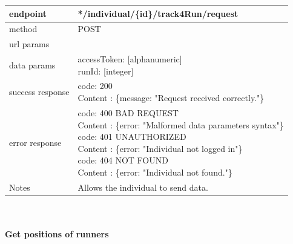 \begin{legal}
\begin{legal}
\begin{itemize}
								\begin{tabularx}{\linewidth}{| l| l }
									\hline
									endpoint & */individual/\{id\}/track4Run/request \\
									\hline
									method & POST \\
									\hline
									url params & \\
									\hline
									data params &
									\parbox{0.7\textwidth}{
										\bigskip
										accessToken: [alphanumeric]\\
										runId: [integer]
										\bigskip
									} \\
									\hline
									success response &
									\parbox{0.7\textwidth}{
										\bigskip
										code: 200\\
										Content : \{message: "Request received correctly."\}
										\bigskip
									} \\
									\hline
									error response &
									\parbox{0.7\textwidth}{
										\bigskip
										code: 400 BAD REQUEST \\
										Content : \{error: "Malformed data parameters syntax"\}\\
										code: 401 UNAUTHORIZED \\
										Content : \{error: "Individual not logged in"\}\\
										code: 404 NOT FOUND \\
										Content : \{error: "Individual not found."\}
										\bigskip
									} \\
									\hline
									Notes & 
									\parbox{0.7\textwidth}{
										\bigskip Allows the individual to send data.
									\bigskip}  \\
									\hline
								\end{tabularx}\\\\
								
								\textbf{Get positions of runners} \\
			

\end{itemize}
\end{legal}
\end{legal}
